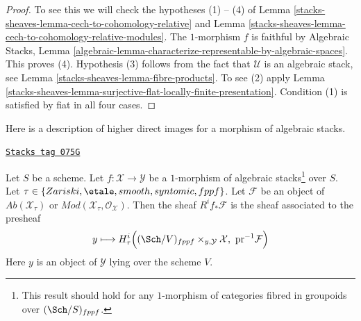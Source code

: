 \begin{proof}
To see this we will check the hypotheses (1) -- (4) of
Lemma \ref{stacks-sheaves-lemma-cech-to-cohomology-relative} and
Lemma \ref{stacks-sheaves-lemma-cech-to-cohomology-relative-modules}.
The $1$-morphism $f$ is faithful by
Algebraic Stacks, Lemma
\ref{algebraic-lemma-characterize-representable-by-algebraic-spaces}.
This proves (4).
Hypothesis (3) follows from the fact that $\mathcal{U}$ is an algebraic
stack, see
Lemma \ref{stacks-sheaves-lemma-fibre-products}.
To see (2) apply
Lemma \ref{stacks-sheaves-lemma-surjective-flat-locally-finite-presentation}.
Condition (1) is satisfied by fiat in all four cases.
\end{proof}

Here is a description of higher direct images for a
morphism of algebraic stacks.

\begin{lemma}
\label{stacks-sheaves-lemma-pushforward-restriction}
\href{https://stacks.math.columbia.edu/tag/075G}{\texttt{Stacks tag 075G}}

Let $S$ be a scheme. Let $f : \mathcal{X} \to \mathcal{Y}$ be a
$1$-morphism of algebraic stacks\footnote{This result should hold
for any $1$-morphism of categories fibred in groupoids over
$(\Sch/S)_{fppf}$.} over $S$.
Let $\tau \in \{Zariski,\linebreak[0] \etale,\linebreak[0]
smooth,\linebreak[0] syntomic,\linebreak[0] fppf\}$.
Let $\mathcal{F}$ be
an object of $\textit{Ab}(\mathcal{X}_\tau)$ or
$\textit{Mod}(\mathcal{X}_\tau, \mathcal{O}_\mathcal{X})$.
Then the sheaf $R^if_*\mathcal{F}$ is the sheaf associated to the
presheaf
$$
y \longmapsto
H^i_\tau\Big((\Sch/V)_{fppf} \times_{y, \mathcal{Y}} \mathcal{X},
\ \text{pr}^{-1}\mathcal{F}\Big)
$$
Here $y$ is an object of $\mathcal{Y}$ lying over the scheme $V$.
\end{lemma}

